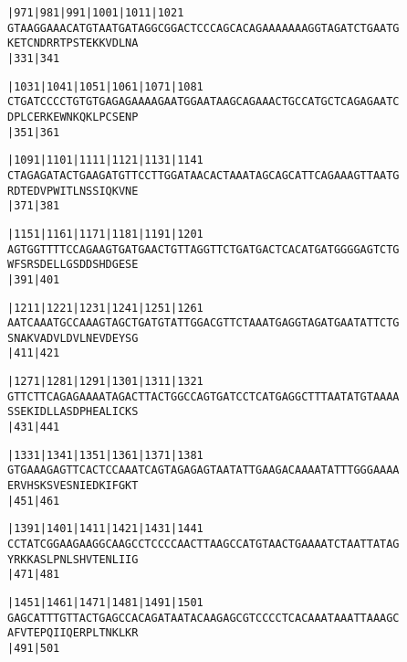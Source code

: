 \documentclass{article}
\begin{document}
\begin{alltt}
|971      |981      |991      |1001     |1011     |1021     
GTAAGGAAACATGTAATGATAGGCGGACTCCCAGCACAGAAAAAAAGGTAGATCTGAATG
  K  E  T  C  N  D  R  R  T  P  S  T  E  K  K  V  D  L  N  A
                    |331                          |341      

|1031     |1041     |1051     |1061     |1071     |1081     
CTGATCCCCTGTGTGAGAGAAAAGAATGGAATAAGCAGAAACTGCCATGCTCAGAGAATC
  D  P  L  C  E  R  K  E  W  N  K  Q  K  L  P  C  S  E  N  P
                    |351                          |361      

|1091     |1101     |1111     |1121     |1131     |1141     
CTAGAGATACTGAAGATGTTCCTTGGATAACACTAAATAGCAGCATTCAGAAAGTTAATG
  R  D  T  E  D  V  P  W  I  T  L  N  S  S  I  Q  K  V  N  E
                    |371                          |381      

|1151     |1161     |1171     |1181     |1191     |1201     
AGTGGTTTTCCAGAAGTGATGAACTGTTAGGTTCTGATGACTCACATGATGGGGAGTCTG
  W  F  S  R  S  D  E  L  L  G  S  D  D  S  H  D  G  E  S  E
                    |391                          |401      

|1211     |1221     |1231     |1241     |1251     |1261     
AATCAAATGCCAAAGTAGCTGATGTATTGGACGTTCTAAATGAGGTAGATGAATATTCTG
  S  N  A  K  V  A  D  V  L  D  V  L  N  E  V  D  E  Y  S  G
                    |411                          |421      

|1271     |1281     |1291     |1301     |1311     |1321     
GTTCTTCAGAGAAAATAGACTTACTGGCCAGTGATCCTCATGAGGCTTTAATATGTAAAA
  S  S  E  K  I  D  L  L  A  S  D  P  H  E  A  L  I  C  K  S
                    |431                          |441      

|1331     |1341     |1351     |1361     |1371     |1381     
GTGAAAGAGTTCACTCCAAATCAGTAGAGAGTAATATTGAAGACAAAATATTTGGGAAAA
  E  R  V  H  S  K  S  V  E  S  N  I  E  D  K  I  F  G  K  T
                    |451                          |461      

|1391     |1401     |1411     |1421     |1431     |1441     
CCTATCGGAAGAAGGCAAGCCTCCCCAACTTAAGCCATGTAACTGAAAATCTAATTATAG
  Y  R  K  K  A  S  L  P  N  L  S  H  V  T  E  N  L  I  I  G
                    |471                          |481      

|1451     |1461     |1471     |1481     |1491     |1501     
GAGCATTTGTTACTGAGCCACAGATAATACAAGAGCGTCCCCTCACAAATAAATTAAAGC
  A  F  V  T  E  P  Q  I  I  Q  E  R  P  L  T  N  K  L  K  R
                    |491                          |501      

\end{alltt}
\end{document}
